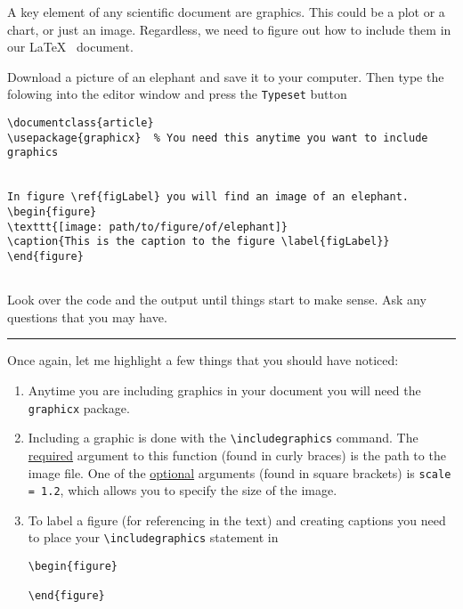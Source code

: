 A key element of any scientific document are graphics.  This could be
a plot or a chart, or just an image.  Regardless, we need to figure
out how to include them in our \LaTeX ~ document.
\begin{enumerate}
\probtwo Download a picture of an elephant and save it to your
computer.  Then type the folowing into the editor window and press the
\verb!Typeset! button 
\begin{Verbatim}
\documentclass{article}
\usepackage{graphicx}  % You need this anytime you want to include graphics


In figure \ref{figLabel} you will find an image of an elephant.
\begin{figure}
\texttt{[image: path/to/figure/of/elephant]}
\caption{This is the caption to the figure \label{figLabel}}
\end{figure}


\end{Verbatim}
Look over the code and the output until things start to make sense.
Ask any questions that you may have.
\end{enumerate}

\noindent\rule{5 in}{0.01 in}
\noindent Once again, let me highlight a few things that you should have noticed:
\begin{enumerate}
\item Anytime you are including graphics in your document you will
  need the \verb!graphicx! package.
\item Including a graphic is done with the \verb!\includegraphics!
  command.  The \ul{required} argument to this function (found in curly
  braces) is the path to the image file.  One of the \ul{optional} arguments
  (found in square brackets) is \verb!scale = 1.2!, which allows you
  to specify the size of the image.
\item To label a figure (for referencing in the text) and creating
  captions you need to place your \verb!\includegraphics! statement in
\begin{Verbatim}
\begin{figure}

\end{figure}
\end{Verbatim}
\end{enumerate}


